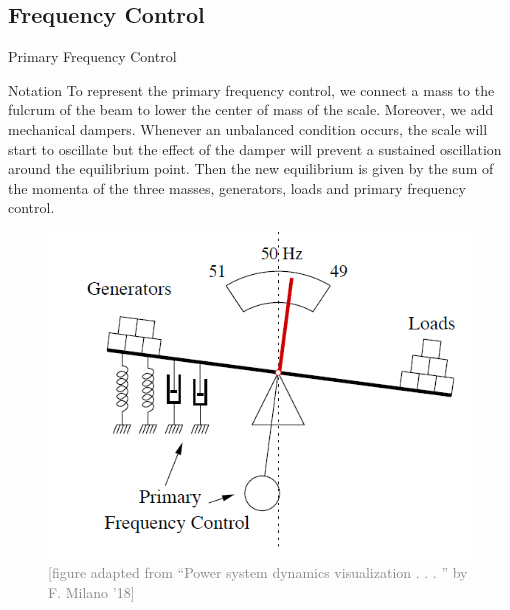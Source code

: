 \documentclass{beamer}
\begin{document}
\subsection{Frequency Control}
\begin{frame}{Primary Frequency Control}
\begin{block}{Notation}
{\tiny To represent the primary frequency control, we connect a mass to the fulcrum of the beam to lower
the center of mass of the scale. Moreover, we add mechanical dampers. Whenever an unbalanced condition occurs, the scale will start to oscillate
but the effect of the damper will prevent a sustained oscillation around the equilibrium point. Then the
new equilibrium is given by the sum of the momenta of the three masses, generators, loads and
primary frequency control.}
\end{block}

        \begin{figure}
        \includegraphics[scale=0.35]{Figures/SystemInertia.PNG}
        \caption{\textcolor{gray}{\tiny [figure adapted from “Power system dynamics visualization . . . ” by F. Milano ’18]}}
        \end{figure}

\end{frame}
\end{document}
